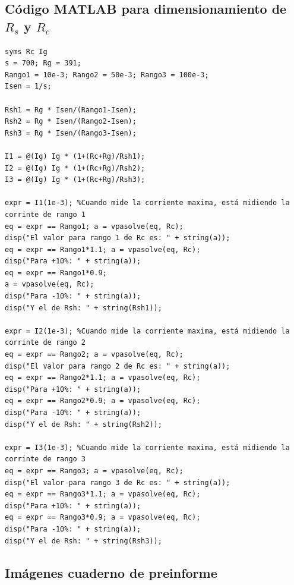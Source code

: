 \subsection{Código MATLAB para dimensionamiento de $R_s$ y $R_c$}


\begin{lstlisting}[caption={Cálculo de resistencias Shunt $R_s$ y de calibración $R_c$ para un amperímetro de bobina móvil de tres rangos},label={lst:matlab_voltimetro}]
syms Rc Ig
s = 700; Rg = 391;
Rango1 = 10e-3; Rango2 = 50e-3; Rango3 = 100e-3;
Isen = 1/s;

Rsh1 = Rg * Isen/(Rango1-Isen);
Rsh2 = Rg * Isen/(Rango2-Isen);
Rsh3 = Rg * Isen/(Rango3-Isen);

I1 = @(Ig) Ig * (1+(Rc+Rg)/Rsh1);
I2 = @(Ig) Ig * (1+(Rc+Rg)/Rsh2);
I3 = @(Ig) Ig * (1+(Rc+Rg)/Rsh3);

expr = I1(1e-3); %Cuando mide la corriente maxima, está midiendo la corrinte de rango 1
eq = expr == Rango1; a = vpasolve(eq, Rc);
disp("El valor para rango 1 de Rc es: " + string(a));
eq = expr == Rango1*1.1; a = vpasolve(eq, Rc);
disp("Para +10%: " + string(a));
eq = expr == Rango1*0.9;
a = vpasolve(eq, Rc);
disp("Para -10%: " + string(a));
disp("Y el de Rsh: " + string(Rsh1));

expr = I2(1e-3); %Cuando mide la corriente maxima, está midiendo la corrinte de rango 2
eq = expr == Rango2; a = vpasolve(eq, Rc);
disp("El valor para rango 2 de Rc es: " + string(a));
eq = expr == Rango2*1.1; a = vpasolve(eq, Rc);
disp("Para +10%: " + string(a));
eq = expr == Rango2*0.9; a = vpasolve(eq, Rc);
disp("Para -10%: " + string(a));
disp("Y el de Rsh: " + string(Rsh2));

expr = I3(1e-3); %Cuando mide la corriente maxima, está midiendo la corrinte de rango 3
eq = expr == Rango3; a = vpasolve(eq, Rc);
disp("El valor para rango 3 de Rc es: " + string(a));
eq = expr == Rango3*1.1; a = vpasolve(eq, Rc);
disp("Para +10%: " + string(a));
eq = expr == Rango3*0.9; a = vpasolve(eq, Rc);
disp("Para -10%: " + string(a));
disp("Y el de Rsh: " + string(Rsh3));
\end{lstlisting}



\subsection{Imágenes cuaderno de preinforme}


